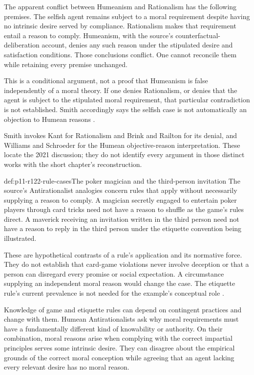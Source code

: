 The apparent conflict between Humeanism and Rationalism has the following
premises. The selfish agent remains subject to a moral requirement despite
having no intrinsic desire served by compliance. Rationalism makes that
requirement entail a reason to comply. Humeanism, with the source's
counterfactual-deliberation account, denies any such reason under the
stipulated desire and satisfaction conditions. Those conclusions conflict.
One cannot reconcile them while retaining every premise unchanged.

This is a conditional argument, not a proof that Humeanism is false
independently of a moral theory. If one denies Rationalism, or denies that
the agent is subject to the stipulated moral requirement, that particular
contradiction is not established. Smith accordingly says the selfish
case is not automatically an objection to Humean reasons
\parencite[p.~695]{Smith2021MoralReasons}.

Smith invokes Kant for Rationalism and Brink and Railton for its denial,
and Williams and Schroeder for the Humean objective-reason interpretation.
These locate the 2021 discussion; they do not identify every argument
in those distinct works with the short chapter's reconstruction.

\begin{hbexample}{def:p11-r122-rule-cases}{The poker magician and the third-person invitation}
The source's Antirationalist analogies concern rules that apply without
necessarily supplying a reason to comply. A magician secretly engaged
to entertain poker players through card tricks need not have a reason
to shuffle as the game's rules direct. A maverick receiving an invitation
written in the third person need not have a reason to reply in the
third person under the etiquette convention being illustrated.

These are hypothetical contrasts of a rule's application and its
normative force. They do not establish that card-game violations never
involve deception or that a person can disregard every promise or social
expectation. A circumstance supplying an independent moral reason would
change the case. The etiquette rule's current prevalence is not needed
for the example's conceptual role
\parencite[pp.~695--697]{Smith2021MoralReasons}.
\end{hbexample}

Knowledge of game and etiquette rules can depend on contingent practices
and change with them. Humean Antirationalists ask why moral requirements
must have a fundamentally different kind of knowability or authority.
On their combination, moral reasons arise when complying with the correct
impartial principles serves some intrinsic desire. They can disagree
about the empirical grounds of the correct moral conception while agreeing
that an agent lacking every relevant desire has no moral reason.


